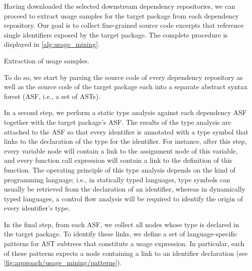 Having downloaded the selected downstream dependency repositories, we can proceed to extract usage samples for the target package from each dependency repository.
Our goal is to collect fine-grained source code excerpts that reference single identifiers exposed by the target package.
The complete procedure is displayed in \cref{alg:usage_mining}.

\begin{algorithm}[b]
	\caption{Extraction of usage samples.}\label{alg:usage_mining}

	\;
\end{algorithm}

To do so, we start by parsing the source code of every dependency repository as well as the source code of the target package each into a separate abstract syntax forest (ASF, i.e., a set of ASTs).

In a second step, we perform a static type analysis against each dependency ASF together with the target package's ASF.
The results of the type analysis are attached to the ASF so that every identifier is annotated with a type symbol that links to the declaration of the type for the identifier.
For instance, after this step, every variable node will contain a link to the assignment node of this variable, and every function call expression will contain a link to the definition of this function.
The operating principle of this type analysis depends on the kind of programming language; i.e., in statically typed languages, type symbols can usually be retrieved from the declaration of an identifier, whereas in dynamically typed languages, a control flow analysis will be required to identify the origin of every identifier's type.

In the final step, from each ASF, we collect all nodes whose type is declared in the target package.
To identify these links, we define a set of language-specific patterns for AST subtrees that constitute a usage expression.
In particular, each of these patterns expects a node containing a link to an identifier declaration (see \cref{fig:approach/usage_mining/patterns}).
